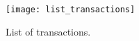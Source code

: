 \begin{figure}[!htbp]
    \centering
    \texttt{[image: list\_transactions]}
    \caption{List of transactions.}
    \label{fig:list_transactions}
\end{figure}
    